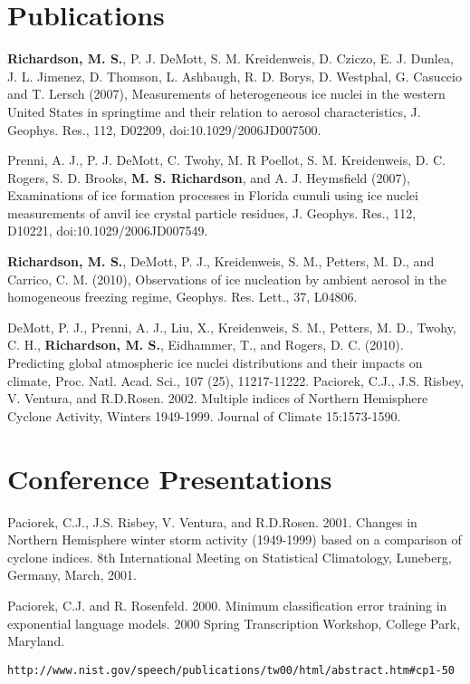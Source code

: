 \documentclass[margin,line]{res}
\begin{document}
\begin{resume}

\section{\sc Publications}
{\bf Richardson, M. S.}, P. J. DeMott, S. M. Kreidenweis, D. Cziczo, E. J. Dunlea, J. L. Jimenez, D. Thomson, L. Ashbaugh, R. D. Borys, D. Westphal, G. Casuccio and T. Lersch (2007), Measurements of heterogeneous ice nuclei in the western United States in springtime and their relation to aerosol characteristics, J. Geophys. Res., 112, D02209, doi:10.1029/2006JD007500.

Prenni, A. J., P. J. DeMott, C. Twohy, M. R Poellot, S. M. Kreidenweis, D. C. Rogers, S. D. Brooks, {\bf M. S. Richardson}, and A. J. Heymsfield (2007), Examinations of ice formation processes in Florida cumuli using ice nuclei measurements of anvil ice crystal particle residues, J. Geophys. Res., 112, D10221, doi:10.1029/2006JD007549.

{\bf Richardson, M. S.}, DeMott, P. J., Kreidenweis, S. M., Petters, M. D., and Carrico, C. M. (2010), Observations of ice nucleation by ambient aerosol in the homogeneous freezing regime, Geophys. Res. Lett., 37, L04806.

DeMott, P. J., Prenni, A. J., Liu, X., Kreidenweis, S. M., Petters, M. D., Twohy, C. H., {\bf Richardson, M. S.}, Eidhammer, T., and Rogers, D. C. (2010). Predicting global atmospheric ice nuclei distributions and their impacts on climate, Proc. Natl. Acad. Sci., 107 (25), 11217-11222.
Paciorek, C.J., J.S. Risbey, V. Ventura, and R.D.Rosen. 2002. Multiple indices of Northern Hemisphere Cyclone
Activity, Winters 1949-1999. Journal of Climate 15:1573-1590.

\section{\sc Conference Presentations}
Paciorek, C.J., J.S. Risbey, V. Ventura, and R.D.Rosen.  2001.  Changes in Northern Hemisphere winter storm activity (1949-1999) based
on a comparison of cyclone indices.  8th International Meeting on
Statistical Climatology, Luneberg, Germany, March, 2001.

Paciorek, C.J. and R. Rosenfeld.  2000.  Minimum classification error
training in exponential language models.  2000 Spring Transcription
Workshop, College Park, Maryland.
\vspace*{-.25in}  
\begin{verbatim}http://www.nist.gov/speech/publications/tw00/html/abstract.htm#cp1-50\end{verbatim}


\end{resume}
\end{document}
